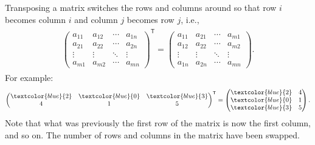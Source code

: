 \documentclass[letterpaper,10pt,english]{jupyterBook}
\begin{document}
\sphinxAtStartPar
Transposing a matrix switches the rows and columns around so that row \(i\) becomes column \(i\) and column \(j\) becomes row \(j\), i.e.,
\begin{equation*}
\begin{split} \begin{align*}
    \begin{pmatrix}
        a_{11} & a_{12} & \cdots & a_{1n} \\
        a_{21} & a_{22} & \cdots & a_{2n} \\
        \vdots & \vdots & \ddots & \vdots \\
        a_{m1} & a_{m2} & \cdots & a_{mn}
    \end{pmatrix}^\mathsf{T} =
    \begin{pmatrix}
        a_{11} & a_{21} & \cdots & a_{m1} \\
        a_{12} & a_{22} & \cdots & a_{m2} \\
        \vdots & \vdots & \ddots & \vdots \\
        a_{1n} & a_{2n} & \cdots & a_{mn}
    \end{pmatrix}.
\end{align*} \end{split}
\end{equation*}
\sphinxAtStartPar
For example:
\begin{equation*}
\begin{split} \begin{align*}
    \begin{pmatrix}
        \textcolor{blue}{2} & \textcolor{blue}{0} & \textcolor{blue}{3} \\
        4 & 1 & 5 \\
    \end{pmatrix}^\mathsf{T} =
    \begin{pmatrix}
        \textcolor{blue}{2} & 4 \\
        \textcolor{blue}{0} & 1 \\
        \textcolor{blue}{3} & 5
    \end{pmatrix}.
\end{align*} \end{split}
\end{equation*}
\sphinxAtStartPar
Note that what was previously the first row of the matrix is now the first column, and so on. The number of rows and columns in the matrix have been swapped.
\label{_pages/1.1_Matrix_operations:properties-of-matrix-transpose-theorem}
\end{document}
